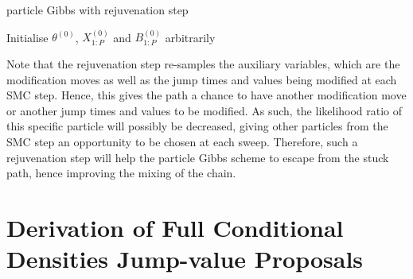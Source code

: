 \documentclass[12pt,a4paper]{article}
\begin{document}
\begin{algorithm}[htb!]
    \caption{particle Gibbs with rejuvenation step}
            Initialise $\theta^{(0)}$, $X_{1:P}^{(0)}$ and $B_{1:P}^{(0)}$ arbitrarily\;
    \label{particle Gibbs-rejuvenation}
\end{algorithm}

Note that the rejuvenation step re-samples the auxiliary variables, which are the modification moves as well as the jump times and values being modified at each SMC step. Hence, this gives the path a chance to have another modification move or another jump times and values to be modified. As such, the likelihood ratio of this specific particle will possibly be decreased, giving other particles from the SMC step an opportunity to be chosen at each sweep. Therefore, such a rejuvenation step will help the particle Gibbs scheme to escape from the stuck path, hence improving the mixing of the chain. 
\section{Derivation of Full Conditional Densities Jump-value Proposals}
\end{document}
